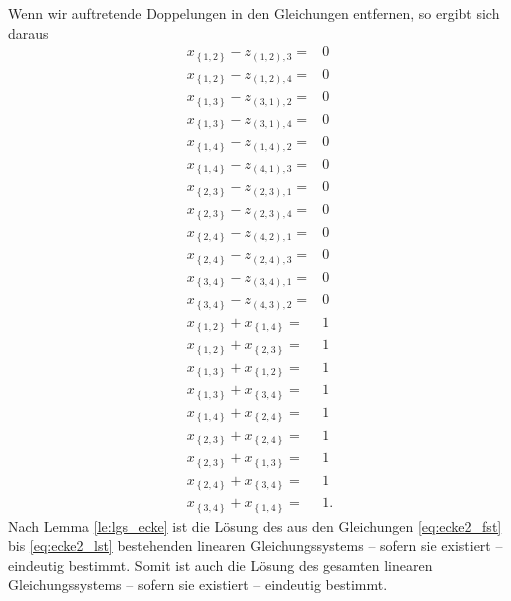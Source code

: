\documentclass[10p,a4paper,BCOR = 12mm, DIV=15]{scrbook}
\begin{document}
{\begin{bew}
Wenn wir auftretende Doppelungen in den Gleichungen entfernen, so ergibt sich daraus
{
\allowdisplaybreaks
\begin{align}
x_{\left\{1, 2\right\}} - z_{\left(1, 2\right), 3} = & 0 \nonumber \\
x_{\left\{1, 2\right\}} - z_{\left(1, 2\right), 4} = & 0 \nonumber \\
x_{\left\{1, 3\right\}} - z_{\left(3, 1\right), 2} = & 0 \nonumber \\
x_{\left\{1, 3\right\}} - z_{\left(3, 1\right), 4} = & 0 \nonumber \\
x_{\left\{1, 4\right\}} - z_{\left(1, 4\right), 2} = & 0 \nonumber \\
x_{\left\{1, 4\right\}} - z_{\left(4, 1\right), 3} = & 0 \nonumber \\
x_{\left\{2, 3\right\}} - z_{\left(2, 3\right), 1} = & 0 \nonumber \\
x_{\left\{2, 3\right\}} - z_{\left(2, 3\right), 4} = & 0 \nonumber \\
x_{\left\{2, 4\right\}} - z_{\left(4, 2\right), 1} = & 0 \nonumber \\
x_{\left\{2, 4\right\}} - z_{\left(2, 4\right), 3} = & 0 \nonumber \\
x_{\left\{3, 4\right\}} - z_{\left(3, 4\right), 1} = & 0 \nonumber \\
x_{\left\{3, 4\right\}} - z_{\left(4, 3\right), 2} = & 0 \nonumber \\
x_{\left\{1, 2\right\}} + x_{\left\{1, 4\right\}} = & 1 \label{eq:ecke2_fst} \\
x_{\left\{1, 2\right\}} + x_{\left\{2, 3\right\}} = & 1 \\
x_{\left\{1, 3\right\}} + x_{\left\{1, 2\right\}} = & 1 \\
x_{\left\{1, 3\right\}} + x_{\left\{3, 4\right\}} = & 1 \\
x_{\left\{1, 4\right\}} + x_{\left\{2, 4\right\}} = & 1 \\
x_{\left\{2, 3\right\}} + x_{\left\{2, 4\right\}} = & 1 \\
x_{\left\{2, 3\right\}} + x_{\left\{1, 3\right\}} = & 1 \\
x_{\left\{2, 4\right\}} + x_{\left\{3, 4\right\}} = & 1 \\
x_{\left\{3, 4\right\}} + x_{\left\{1, 4\right\}} = & 1. \label{eq:ecke2_lst}
\end{align}
}
Nach Lemma \ref{le:lgs_ecke} ist die Lösung des aus den Gleichungen \eqref{eq:ecke2_fst} bis \eqref{eq:ecke2_lst} bestehenden linearen Gleichungssystems -- sofern sie existiert -- eindeutig bestimmt. Somit ist auch die Lösung des gesamten linearen Gleichungssystems -- sofern sie existiert -- eindeutig bestimmt.


\end{bew}}
\end{document}
